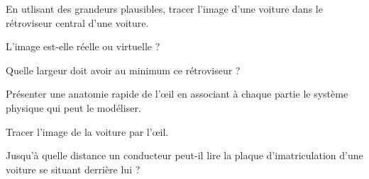 

\question En utlisant des grandeurs plausibles, tracer l'image d'une voiture dans le rétroviseur central d'une voiture.

\question L'image est-elle réelle ou virtuelle ?

\question Quelle largeur doit avoir au minimum ce rétroviseur ?

\question Présenter une anatomie rapide de l'œil en associant à chaque partie le système physique qui peut le modéliser.

\question Tracer l'image de la voiture par l'œil.

\question Jusqu'à quelle distance un conducteur peut-il lire la plaque d'imatriculation d'une voiture se situant derrière lui ?
